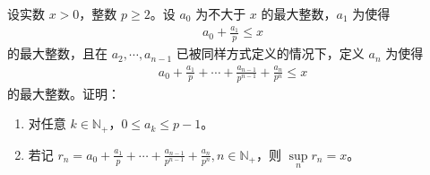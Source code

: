 \documentclass[../../main.tex]{subfiles}%
\begin{document}
\begin{example}
设实数 $x>0$，整数 $p\geqslant 2$。设 $a_0$ 为不大于 $x$ 的最大整数，$a_1$ 为使得
\begin{align*}
a_0 + \frac{a_1}{p} \leqslant x
\end{align*}
的最大整数，且在 $a_2,\cdots,a_{n-1}$ 已被同样方式定义的情况下，定义 $a_n$ 为使得
\begin{align*}
a_0 + \frac{a_1}{p} + \cdots + \frac{a_{n-1}}{p^{n-1}} + \frac{a_n}{p^n} \leqslant x
\end{align*}
的最大整数。证明：
\begin{enumerate}[(1)]
\item 对任意 $k \in \mathbb{N}_+$，$0 \leqslant a_k \leqslant p-1$。
\item 若记 $r_n = a_0 + \frac{a_1}{p} + \cdots + \frac{a_{n-1}}{p^{n-1}} + \frac{a_n}{p^n}, n \in \mathbb{N}_+$，则 $\sup\limits_{n} r_n = x$。
\end{enumerate}
\end{example}
\end{document}
